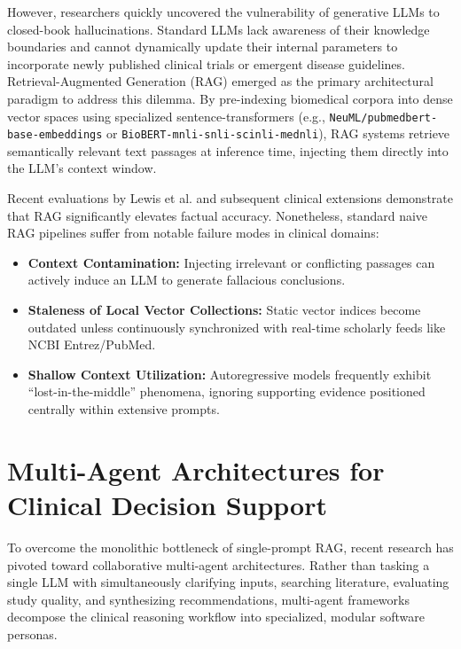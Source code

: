 \documentclass[12pt,a4paper]{report}
\begin{document}
However, researchers quickly uncovered the vulnerability of generative LLMs to closed-book hallucinations. Standard LLMs lack awareness of their knowledge boundaries and cannot dynamically update their internal parameters to incorporate newly published clinical trials or emergent disease guidelines. Retrieval-Augmented Generation (RAG) emerged as the primary architectural paradigm to address this dilemma. By pre-indexing biomedical corpora into dense vector spaces using specialized sentence-transformers (e.g., \texttt{NeuML/pubmedbert-base-embeddings} or \texttt{BioBERT-mnli-snli-scinli-mednli}), RAG systems retrieve semantically relevant text passages at inference time, injecting them directly into the LLM's context window.

Recent evaluations by Lewis et al. and subsequent clinical extensions demonstrate that RAG significantly elevates factual accuracy. Nonetheless, standard naive RAG pipelines suffer from notable failure modes in clinical domains:
\begin{itemize}
    \item \textbf{Context Contamination:} Injecting irrelevant or conflicting passages can actively induce an LLM to generate fallacious conclusions.
    \item \textbf{Staleness of Local Vector Collections:} Static vector indices become outdated unless continuously synchronized with real-time scholarly feeds like NCBI Entrez/PubMed.
    \item \textbf{Shallow Context Utilization:} Autoregressive models frequently exhibit ``lost-in-the-middle'' phenomena, ignoring supporting evidence positioned centrally within extensive prompts.
\end{itemize}

\section{Multi-Agent Architectures for Clinical Decision Support}
To overcome the monolithic bottleneck of single-prompt RAG, recent research has pivoted toward collaborative multi-agent architectures. Rather than tasking a single LLM with simultaneously clarifying inputs, searching literature, evaluating study quality, and synthesizing recommendations, multi-agent frameworks decompose the clinical reasoning workflow into specialized, modular software personas.
\end{document}
